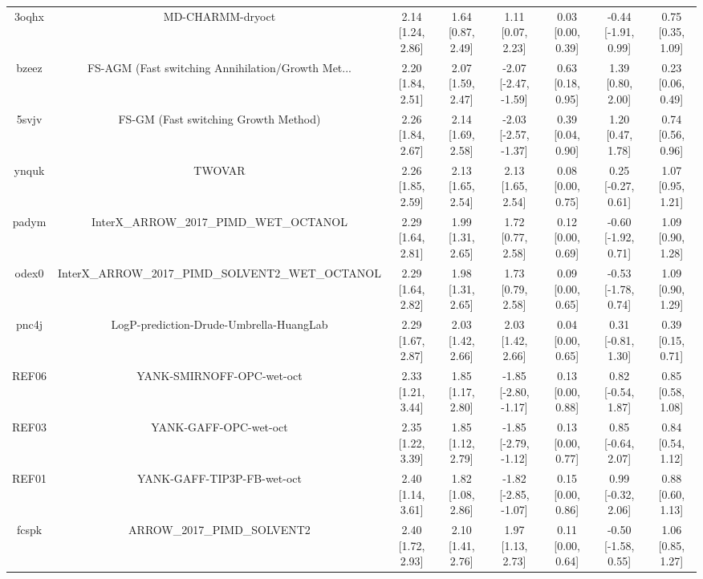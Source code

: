 \documentclass{article}
\begin{document}
\begin{center}
\begin{longtable}{|cccccccc|}
 3oqhx &                                   MD-CHARMM-dryoct &  2.14 [1.24, 2.86] &  1.64 [0.87, 2.49] &     1.11 [0.07, 2.23] &  0.03 [0.00, 0.39] &  -0.44 [-1.91, 0.99] &     0.75 [0.35, 1.09] \\
 bzeez &  FS-AGM (Fast switching Annihilation/Growth Met... &  2.20 [1.84, 2.51] &  2.07 [1.59, 2.47] &  -2.07 [-2.47, -1.59] &  0.63 [0.18, 0.95] &    1.39 [0.80, 2.00] &     0.23 [0.06, 0.49] \\
 5svjv &               FS-GM (Fast switching Growth Method) &  2.26 [1.84, 2.67] &  2.14 [1.69, 2.58] &  -2.03 [-2.57, -1.37] &  0.39 [0.04, 0.90] &    1.20 [0.47, 1.78] &     0.74 [0.56, 0.96] \\
 ynquk &                                             TWOVAR &  2.26 [1.85, 2.59] &  2.13 [1.65, 2.54] &     2.13 [1.65, 2.54] &  0.08 [0.00, 0.75] &   0.25 [-0.27, 0.61] &     1.07 [0.95, 1.21] \\
 padym &            InterX\_ARROW\_2017\_PIMD\_WET\_OCTANOL &  2.29 [1.64, 2.81] &  1.99 [1.31, 2.65] &     1.72 [0.77, 2.58] &  0.12 [0.00, 0.69] &  -0.60 [-1.92, 0.71] &     1.09 [0.90, 1.28] \\
 odex0 &  InterX\_ARROW\_2017\_PIMD\_SOLVENT2\_WET\_OCTANOL &  2.29 [1.64, 2.82] &  1.98 [1.31, 2.65] &     1.73 [0.79, 2.58] &  0.09 [0.00, 0.65] &  -0.53 [-1.78, 0.74] &     1.09 [0.90, 1.29] \\
 pnc4j &            LogP-prediction-Drude-Umbrella-HuangLab &  2.29 [1.67, 2.87] &  2.03 [1.42, 2.66] &     2.03 [1.42, 2.66] &  0.04 [0.00, 0.65] &   0.31 [-0.81, 1.30] &     0.39 [0.15, 0.71] \\
 REF06 &                          YANK-SMIRNOFF-OPC-wet-oct &  2.33 [1.21, 3.44] &  1.85 [1.17, 2.80] &  -1.85 [-2.80, -1.17] &  0.13 [0.00, 0.88] &   0.82 [-0.54, 1.87] &     0.85 [0.58, 1.08] \\
 REF03 &                              YANK-GAFF-OPC-wet-oct &  2.35 [1.22, 3.39] &  1.85 [1.12, 2.79] &  -1.85 [-2.79, -1.12] &  0.13 [0.00, 0.77] &   0.85 [-0.64, 2.07] &     0.84 [0.54, 1.12] \\
 REF01 &                         YANK-GAFF-TIP3P-FB-wet-oct &  2.40 [1.14, 3.61] &  1.82 [1.08, 2.86] &  -1.82 [-2.85, -1.07] &  0.15 [0.00, 0.86] &   0.99 [-0.32, 2.06] &     0.88 [0.60, 1.13] \\
 fcspk &                        ARROW\_2017\_PIMD\_SOLVENT2 &  2.40 [1.72, 2.93] &  2.10 [1.41, 2.76] &     1.97 [1.13, 2.73] &  0.11 [0.00, 0.64] &  -0.50 [-1.58, 0.55] &     1.06 [0.85, 1.27] \\

\end{longtable}
\end{center}
\end{document}
